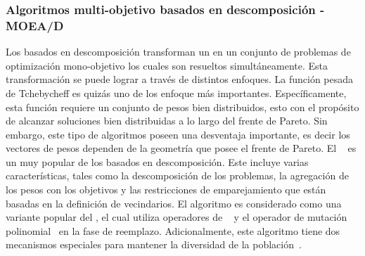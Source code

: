 \subsubsection{Algoritmos multi-objetivo basados en descomposición - MOEA/D}

Los \MOEAS{} basados en descomposición \cite{Joel:MOEAD} transforman un \MOP{} en un conjunto de problemas de optimización mono-objetivo los cuales son resueltos simultáneamente.
%
Esta transformación se puede lograr a través de distintos enfoques.
%
La función pesada de Tchebycheff es quizás uno de los enfoque más importantes.
%
Específicamente, esta función requiere un conjunto de pesos bien distribuidos, esto con el propósito de alcanzar soluciones bien distribuidas a lo largo del frente de Pareto.
%
Sin embargo, este tipo de algoritmos poseen una desventaja importante, es decir los vectores de pesos dependen de la geometría que posee el frente de Pareto.
El \MOEA{}~\cite{Joel:MOEAD} es un \MOEA{} muy popular de los basados en descomposición.
%
Este incluye varias características, tales como la descomposición de los problemas, la agregación de los pesos con los objetivos y las restricciones de emparejamiento que están basadas en la definición de vecindarios.
%
%
El algoritmo \MOEADDE{} es considerado como una variante popular del \MOEAD{}, el cual utiliza operadores de \DE{}~\cite{price2006differential} y el operador de mutación polinomial~\cite{hamdan2012distribution} en la fase de reemplazo.
%
Adicionalmente, este algoritmo tiene dos mecanismos especiales para mantener la diversidad de la población~\cite{zhang2009performance}.
%

